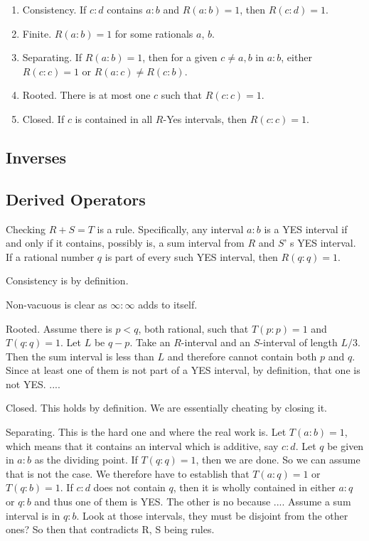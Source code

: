 \documentclass[12pt]{article}
\theoremstyle{remark}
\begin{document}
\begin{enumerate}
    \item Consistency. If $c:d$ contains $a:b$ and $R(a:b) = 1$, then $R(c:d) = 1$.
    \item Finite. $R(a:b) = 1$ for some rationals $a$, $b$.
    \item Separating. If $R(a:b)=1$, then for a given $c \neq a, b$ in $a:b$, either $R(c:c) = 1$ or $R(a:c) \neq R(c:b)$. 
    \item Rooted. There is at most one $c$ such that $R(c:c) =1$.
    \item Closed. If $c$ is contained in all $R$-Yes intervals, then $R(c:c) = 1$.
\end{enumerate}


\subsection{Inverses}



\subsection{Derived Operators}

Checking $R+S=T$ is a rule. Specifically, any interval $a:b$ is a YES interval if and only if it contains, possibly is, a sum interval from $R$ and $S$' s YES interval. If a rational number $q$ is part of every such YES interval, then $R(q:q) = 1$. 

Consistency is by definition. 

Non-vacuous is clear as $\infty:\infty$ adds to itself. 

Rooted. Assume there is $p<q$, both rational, such that $T(p:p)=1$ and $T(q:q) =1$. Let $L$ be $q-p$. Take an $R$-interval and an $S$-interval of length $L/3$. Then the sum interval is less than $L$ and therefore cannot contain both $p$ and $q$. Since at least one of them is not part of a YES interval, by definition, that one is not YES.  .... 

Closed. This holds by definition. We are essentially cheating by closing it. 

Separating. This is the hard one and where the real work is. Let $T(a:b) = 1$, which means that it contains an interval which is additive, say $c:d$. Let $q$ be given in $a:b$ as the dividing point. If $T(q:q) = 1$, then we are done. So we can assume that is not the case. We therefore have to establish that $T(a:q)=1$ or $T(q:b) = 1$. If $c:d$ does not contain $q$, then it is wholly contained in either $a:q$ or $q:b$ and thus one of them is YES. The other is no because .... Assume a sum interval is in $q:b$. Look at those intervals, they must be disjoint from the other ones? So then that contradicts R, S being rules. 
\end{document}
